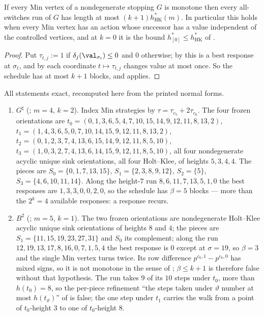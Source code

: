 \begin{corollary}\label{mb:monotone-up}
If every Min vertex of a nondegenerate stopping $G$ is monotone then every
all-switches run of $G$ has length at most
$(k+1)h^{\ast}_{\mathrm{HK}}(m)$. In particular this holds when every Min
vertex has an action whose successor has a value independent of the
controlled vertices, and at $k=0$ it is the bound
$h^{\ast}_{[0]}\le h^{\ast}_{\mathrm{HK}}$ of .
\end{corollary}

\begin{proof}
Put $\tau_{t,j}:=1$ if $\delta_j(\val_{\sigma_t})\le0$ and $0$ otherwise;
by  this is a best response at $\sigma_t$, and by
 each coordinate $t\mapsto\tau_{t,j}$ changes value at most
once. So the schedule has at most $k+1$ blocks, and 
applies.
\end{proof}

\begin{proposition}\label{mb:measured}
All statements exact, recomputed here from the printed normal forms.
\begin{enumerate}[label=(\alph*),leftmargin=2.2em]
\item $G^{\sharp}$ (; $m=4$, $k=2$). Index Min
      strategies by $\tau=\tau_{c_5}+2\tau_{c_6}$. The four frozen
      orientations are
      $t_{0}=(0,1,3,6,5,4,7,10,15,14,9,12,11,8,13,2)$,
      $t_{1}=(1,4,3,6,5,0,7,10,14,15,9,12,11,8,13,2)$,
      $t_{2}=(0,1,2,3,7,4,13,6,15,14,9,12,11,8,5,10)$,
      $t_{3}=(1,0,3,2,7,4,13,6,14,15,9,12,11,8,5,10)$,
      all four nondegenerate acyclic unique sink orientations, all four
      Holt--Klee, of heights $5,3,4,4$. The pieces are
      $S_{0}=\{0,1,7,13,15\}$, $S_{1}=\{2,3,8,9,12\}$,
      $S_{2}=\{5\}$, $S_{3}=\{4,6,10,11,14\}$. Along the
      height-$7$ run $8,6,11,7,13,5,1,0$ the best responses are
      $1,3,3,0,0,2,0$, so the schedule has $\beta=5$ blocks --- more than
      the $2^{k}=4$ available responses: a response recurs.
\item $B^{2}$ (; $m=5$, $k=1$). The two frozen
      orientations are nondegenerate Holt--Klee acyclic unique sink
      orientations of heights $8$ and $4$; the pieces are
      $S_1=\{11,15,19,23,27,31\}$ and $S_0$ its complement; along the run
      $12,19,13,17,8,16,0,7,1,5,4$ the best response is $0$ except at
      $\sigma=19$, so $\beta=3$ and the single Min vertex turns twice. Its
      row difference $p^{c_6,1}-p^{c_6,0}$ has mixed signs, so it is not
      monotone in the sense of ; $\beta\le k+1$ is
      therefore false without that hypothesis. The run takes $9$ of its
      $10$ steps under $t_0$, more than $h(t_0)=8$, so the per-piece
      refinement ``the steps taken under $\vartheta$ number at most
      $h(t_\vartheta)$'' of  is false; the one step under
      $t_1$ carries the walk from a point of $t_0$-height $3$ to one of
      $t_0$-height $8$.
\end{enumerate}
\end{proposition}

